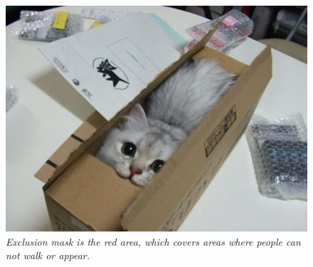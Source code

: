 \begin{figure}[htb]
	\centering
	\includegraphics[width=\linewidth]{images/boxcat.jpg}
	\caption[Exclusion mask]{\textit{Exclusion mask is the red area, which covers areas where people can not walk or appear.
}}
	\label{fig:exclusionMask}  %
\end{figure}